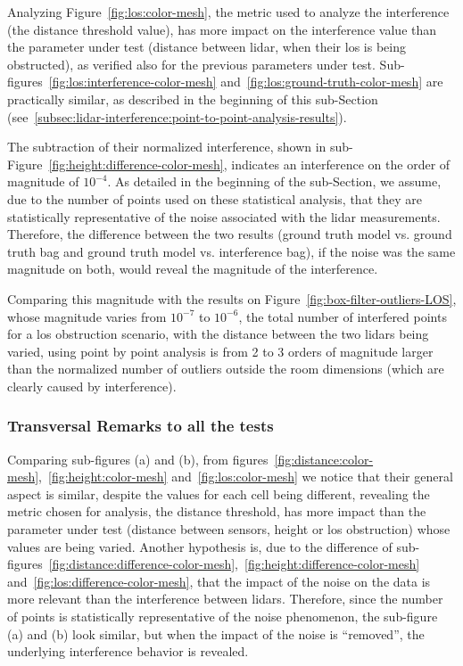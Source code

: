 Analyzing Figure~\ref{fig:los:color-mesh}, the metric used to analyze the interference (the distance threshold value), has more impact on the interference value than the parameter under test (distance between \ac{lidar}, when their \ac{los} is being obstructed), as verified also for the previous parameters under test. Sub-figures~\ref{fig:los:interference-color-mesh} and~\ref{fig:los:ground-truth-color-mesh} are practically similar, as described in the beginning of this sub-Section (see~\ref{subsec:lidar-interference:point-to-point-analysis-results}).

The subtraction of their normalized interference, shown in sub-Figure~\ref{fig:height:difference-color-mesh}, indicates an interference on the order of magnitude of $10^{-4}$. As detailed in the beginning of the sub-Section, we assume, due to the number of points used on these statistical analysis, that they are statistically representative of the noise associated with the \ac{lidar} measurements. Therefore, the difference between the two results (ground truth model vs. ground truth bag and ground truth model vs. interference bag), if the noise was the same magnitude on both, would reveal the magnitude of the interference. 

Comparing this magnitude with the results on Figure~\ref{fig:box-filter-outliers-LOS}, whose magnitude varies from $10^{-7}$ to $10^{-6}$, the total number of interfered points for a \ac{los} obstruction scenario, with the distance between the two \acp{lidar} being varied, using point by point analysis is from 2 to 3 orders of magnitude larger than the normalized number of outliers outside the room dimensions (which are clearly caused by interference).


\subsubsection{Transversal Remarks to all the tests}
Comparing sub-figures (a) and (b), from figures~\ref{fig:distance:color-mesh},~\ref{fig:height:color-mesh} and~\ref{fig:los:color-mesh} we notice that their general aspect is similar, despite the values for each cell being different, revealing the metric chosen for analysis, the distance threshold, has
more impact than the parameter under test (distance between sensors, height or \ac{los} obstruction) whose values are being varied. Another hypothesis is, due to the difference of sub-figures~\ref{fig:distance:difference-color-mesh},~\ref{fig:height:difference-color-mesh} and~\ref{fig:los:difference-color-mesh}, that the impact of the noise on the data is more relevant than the interference between \acp{lidar}. Therefore, since the number of points is statistically representative of the noise phenomenon, the sub-figure (a) and (b) look similar, but when the impact of the noise is ``removed'', the underlying interference behavior is revealed. 

